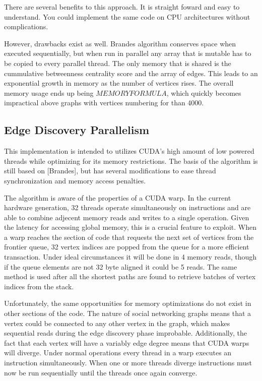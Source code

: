 \documentclass[10pt,twocolumn]{article}
\begin{document}
There are several benefits to this approach. It is straight foward and easy to understand. You could implement the same code on CPU architectures without complications.
 
However, drawbacks exist as well. Brandes algorithm conserves space when executed sequentially, but when run in parallel any array that is mutable has to be copied to every parallel thread. The only memory that is shared is the cummulative betweenness centrality score and the array of edges. This leads to an exponential growth in memory as the number of vertices rises. The overall memory usage ends up being $MEMORY FORMULA$, which quickly becomes impractical above graphs with vertices numbering for than 4000.
 
\subsection{Edge Discovery Parallelism}
\label{implBFS}
This implementation is intended to utilizes CUDA's high amount of low powered threads while optimizing for its memory restrictions. The basis of the algorithm is still based on [Brandes], but has several modifications to ease thread synchronization and memory access penalties.
 
The algorithm is aware of the properties of a CUDA warp. In the current hardware generation, 32 threads operate simultaneously on instructions and are able to combine adjecent memory reads and writes to a single operation. Given the latency for accessing global memory, this is a crucial feature to exploit. When a warp reaches the section of code that requests the next set of vertices from the frontier queue, 32 vertex indices are popped from the queue for a more efficient transaction. Under ideal circumstances it will be done in 4 memory reads, though if the queue elements are not 32 byte aligned it could be 5 reads. The same method is used after all the shortest paths are found to retrieve batches of vertex indices from the stack.
 
Unfortunately, the same opportunities for memory optimizations do not exist in other sections of the code. The nature of social networking graphs means that a vertex could be connected to any other vertex in the graph, which makes sequential reads during the edge discovery phase improbable. Additionally, the fact that each vertex will have a variably edge degree means that CUDA warps will diverge. Under normal operations every thread in a warp executes an instruction simultaneously. When one or more threads diverge instructions must now be run sequentially until the threads once again converge.
 
\end{document}
